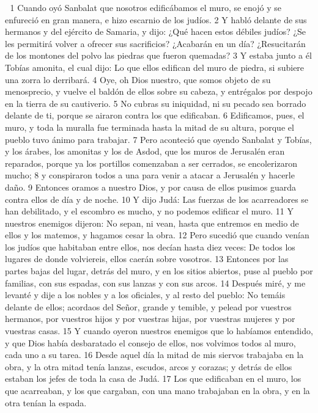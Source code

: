 
1 Cuando oyó Sanbalat que nosotros edificábamos el muro, se enojó y se enfureció en gran manera, e hizo escarnio de los judíos.
2 Y habló delante de sus hermanos y del ejército de Samaria, y dijo: ¿Qué hacen estos débiles judíos? ¿Se les permitirá volver a ofrecer sus sacrificios? ¿Acabarán en un día? ¿Resucitarán de los montones del polvo las piedras que fueron quemadas?
3 Y estaba junto a él Tobías amonita, el cual dijo: Lo que ellos edifican del muro de piedra, si subiere una zorra lo derribará.
4 Oye, oh Dios nuestro, que somos objeto de su menosprecio, y vuelve el baldón de ellos sobre su cabeza, y entrégalos por despojo en la tierra de su cautiverio.
5 No cubras su iniquidad, ni su pecado sea borrado delante de ti, porque se airaron contra los que edificaban.
6 Edificamos, pues, el muro, y toda la muralla fue terminada hasta la mitad de su altura, porque el pueblo tuvo ánimo para trabajar.
7 Pero aconteció que oyendo Sanbalat y Tobías, y los árabes, los amonitas y los de Asdod, que los muros de Jerusalén eran reparados, porque ya los portillos comenzaban a ser cerrados, se encolerizaron mucho;
8 y conspiraron todos a una para venir a atacar a Jerusalén y hacerle daño.
9 Entonces oramos a nuestro Dios, y por causa de ellos pusimos guarda contra ellos de día y de noche.
10 Y dijo Judá: Las fuerzas de los acarreadores se han debilitado, y el escombro es mucho, y no podemos edificar el muro.
11 Y nuestros enemigos dijeron: No sepan, ni vean, hasta que entremos en medio de ellos y los matemos, y hagamos cesar la obra.
12 Pero sucedió que cuando venían los judíos que habitaban entre ellos, nos decían hasta diez veces: De todos los lugares de donde volviereis, ellos caerán sobre vosotros.
13 Entonces por las partes bajas del lugar, detrás del muro, y en los sitios abiertos, puse al pueblo por familias, con sus espadas, con sus lanzas y con sus arcos.
14 Después miré, y me levanté y dije a los nobles y a los oficiales, y al resto del pueblo: No temáis delante de ellos; acordaos del Señor, grande y temible, y pelead por vuestros hermanos, por vuestros hijos y por vuestras hijas, por vuestras mujeres y por vuestras casas.
15 Y cuando oyeron nuestros enemigos que lo habíamos entendido, y que Dios había desbaratado el consejo de ellos, nos volvimos todos al muro, cada uno a su tarea.
16 Desde aquel día la mitad de mis siervos trabajaba en la obra, y la otra mitad tenía lanzas, escudos, arcos y corazas; y detrás de ellos estaban los jefes de toda la casa de Judá.
17 Los que edificaban en el muro, los que acarreaban, y los que cargaban, con una mano trabajaban en la obra, y en la otra tenían la espada.
